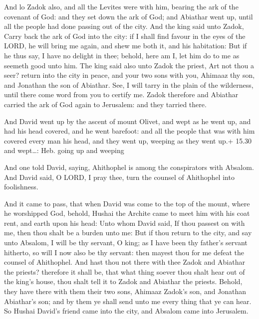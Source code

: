  And lo Zadok also, and all the Levites were with him,
bearing the ark of the covenant of God: and they set down the ark of
God; and Abiathar went up, until all the people had done passing out of
the city.  And the king said unto Zadok, Carry back the ark
of God into the city: if I shall find favour in the eyes of the LORD, he
will bring me again, and shew me both it, and his habitation:
 But if he thus say, I have no delight in thee; behold,
here am I, let him do to me as seemeth good unto him.  The
king said also unto Zadok the priest, Art not thou a seer? return into
the city in peace, and your two sons with you, Ahimaaz thy son, and
Jonathan the son of Abiathar.  See, I will tarry in the
plain of the wilderness, until there come word from you to certify me.
 Zadok therefore and Abiathar carried the ark of God again
to Jerusalem: and they tarried there.

 And David went up by the ascent of mount Olivet, and
wept as he went up, and had his head covered, and he went barefoot: and
all the people that was with him covered every man his head, and they
went up, weeping as they went up.+ 15.30 and wept\ldots: Heb. going up
and weeping

 And one told David, saying, Ahithophel is among the
conspirators with Absalom. And David said, O LORD, I pray thee, turn the
counsel of Ahithophel into foolishness.

 And it came to pass, that when David was come to the top
of the mount, where he worshipped God, behold, Hushai the Archite came
to meet him with his coat rent, and earth upon his head: 
Unto whom David said, If thou passest on with me, then thou shalt be a
burden unto me:  But if thou return to the city, and say
unto Absalom, I will be thy servant, O king; as I have been thy father's
servant hitherto, so will I now also be thy servant: then mayest thou
for me defeat the counsel of Ahithophel.  And hast thou not
there with thee Zadok and Abiathar the priests? therefore it shall be,
that what thing soever thou shalt hear out of the king's house, thou
shalt tell it to Zadok and Abiathar the priests.  Behold,
they have there with them their two sons, Ahimaaz Zadok's son, and
Jonathan Abiathar's son; and by them ye shall send unto me every thing
that ye can hear.  So Hushai David's friend came into the
city, and Absalom came into Jerusalem.


